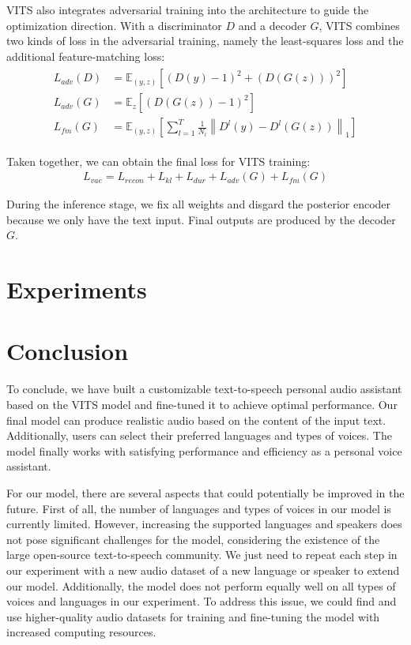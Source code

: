 \documentclass{article}
\begin{document}
VITS also integrates adversarial training into the architecture to guide the optimization direction. With a discriminator $D$ and a decoder $G$, VITS combines two kinds of loss in the adversarial training, namely the least-squares loss and the additional feature-matching loss:
\begin{align}
    \begin{split}
        L_{a d v}(D) & =\mathbb{E}_{(y, z)}\left[(D(y)-1)^{2}+(D(G(z)))^{2}\right] \\
        L_{a d v}(G) & =\mathbb{E}_{z}\left[(D(G(z))-1)^{2}\right] \\
        L_{f m}(G) & =\mathbb{E}_{(y, z)}\left[\sum_{l=1}^{T} \frac{1}{N_{l}}\left\|D^{l}(y)-D^{l}(G(z))\right\|_{1}\right]
    \end{split}
\end{align}

Taken together, we can obtain the final loss for VITS training:
\begin{align}
    L_{v a e}=L_{r e c o n}+L_{k l}+L_{d u r}+L_{a d v}(G)+L_{f m}(G)
\end{align}

During the inference stage, we fix all weights and disgard the posterior encoder because we only have the text input. Final outputs are produced by the decoder $G$.

\section{Experiments}
\label{sec:exper}

\section{Conclusion}
\label{sec:con}
To conclude, we have built a customizable text-to-speech personal audio assistant based on the VITS model and fine-tuned it to achieve optimal performance. Our final model can produce realistic audio based on the content of the input text. Additionally, users can select their preferred languages and types of voices. The model finally works with satisfying performance and efficiency as a personal voice assistant.

For our model, there are several aspects that could potentially be improved in the future. First of all, the number of languages and types of voices in our model is currently limited. However, increasing the supported languages and speakers does not pose significant challenges for the model, considering the existence of the large open-source text-to-speech community. We just need to repeat each step in our experiment with a new audio dataset of a new language or speaker to extend our model. Additionally, the model does not perform equally well on all types of voices and languages in our experiment. To address this issue, we could find and use higher-quality audio datasets for training and fine-tuning the model with increased computing resources.


  
 
\end{document}
